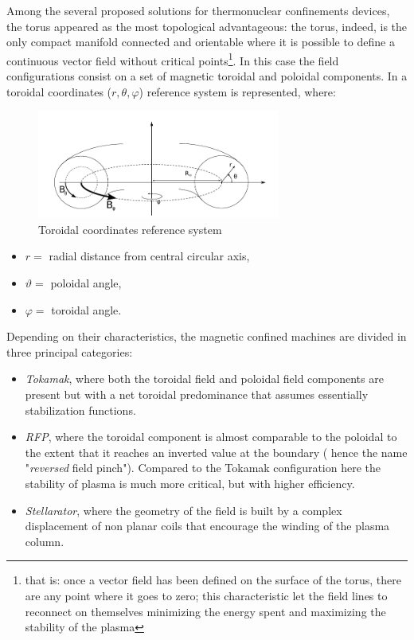 Among the several proposed solutions for thermonuclear confinements devices, the torus appeared as the most topological advantageous: the torus, indeed, is the only compact manifold connected and orientable where it is possible to define a continuous vector field without critical points\footnote{that is: once a vector field has been defined on the surface of the torus, there are any point where it goes to zero; this characteristic let the field lines to reconnect on themselves minimizing the energy spent and maximizing the stability of the plasma}.
In this case the field configurations consist on a set of magnetic toroidal and poloidal components. In \Figure{\ref{fig:intro_toroidal_coords}} a toroidal coordinates ($r,\theta,\varphi$) reference system is represented, where:
\begin{figure}[h!]
    \centering
    \includegraphics[width=8cm]{img/1_intro/toroidal_coords.png}
    \caption{Toroidal coordinates reference system}
    \label{fig:intro_toroidal_coords}
\end{figure}
\begin{itemize}
    \item $r = $ radial distance from central circular axis,
    \item $\vartheta = $ poloidal angle,
    \item $\varphi = $ toroidal angle.
\end{itemize}
Depending on their characteristics, the magnetic confined machines are divided in three principal categories:
\begin{itemize}
    \item \textit{Tokamak}, where both the toroidal field and poloidal field components are present but with a net toroidal predominance that assumes essentially stabilization functions.
    \item \textit{RFP}, where the toroidal component is almost comparable to the poloidal to the extent that it reaches an inverted value at the boundary ( hence the name "\textit{reversed} field pinch"). Compared to the Tokamak configuration here the stability of plasma is much more critical, but with higher efficiency.
    \item \textit{Stellarator}, where the geometry of the field is built by a complex displacement of non planar coils that encourage the winding of the plasma column.
\end{itemize}

